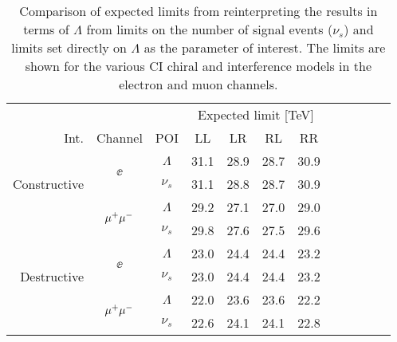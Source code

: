 \begin{table}[htp]
    \begin{center}  
{\begin{tabular}{r c c c c c c c c c c c}\toprule
    & & & \multicolumn{4}{c}{Expected limit [TeV]} \\
    Int. & Channel & POI & LL & LR & RL & RR \\
    \midrule
    \multirow{3}{*}[-1em]{\begin{sideways}Constructive\end{sideways}} & \multirow{2}{*}{$\ee$} & $\Lambda$ & 31.1 & 28.9 & 28.7 & 30.9 \\
    & & $\nu_s$ & 31.1 & 28.8 & 28.7 & 30.9 \\
    \cmidrule{2-7}
     & \multirow{2}{*}{$\mu^{+} \mu^{-}$} & $\Lambda$ & 29.2 & 27.1 & 27.0 & 29.0 \\
    & & $\nu_s$ & 29.8 & 27.6 & 27.5 & 29.6 \\
    \midrule
    \multirow{3}{*}[-1em]{\begin{sideways}Destructive\end{sideways}} & \multirow{2}{*}{$\ee$} & $\Lambda$ & 23.0 & 24.4 & 24.4 & 23.2 \\
    & & $\nu_s$ & 23.0 & 24.4 & 24.4 & 23.2 \\
    \cmidrule{2-7}
     & \multirow{2}{*}{$\mu^{+} \mu^{-}$} & $\Lambda$ & 22.0 & 23.6 & 23.6 & 22.2 \\
    & & $\nu_s$ & 22.6 & 24.1 & 24.1 & 22.8 \\
\bottomrule\end{tabular}}
\caption{Comparison of expected limits from reinterpreting the results in terms of $\Lambda$ from limits on the number of signal events ($\nu_s$) and limits set directly on $\Lambda$ as the parameter of interest. The limits are shown for the various CI chiral and interference models in the electron and muon channels.}  
\label{tab:limits_comparePOI}
\end{center}
\end{table}

\clearpage

